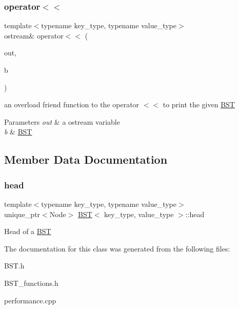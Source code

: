 \subsubsection{\texorpdfstring{operator$<$$<$}{operator<<}}
{\footnotesize\ttfamily template$<$typename key\+\_\+type, typename value\+\_\+type$>$ \\
ostream\& operator$<$$<$ (\begin{DoxyParamCaption}\item[{ostream \&}]{out,  }\item[{\mbox{\hyperlink{class_b_s_t}{B\+ST}}$<$ key\+\_\+type, value\+\_\+type $>$ \&}]{b }\end{DoxyParamCaption})\hspace{0.3cm}{\ttfamily [friend]}}

an overload friend function to the operator $<$$<$ to print the given \mbox{\hyperlink{class_b_s_t}{B\+ST}} 
\begin{DoxyParams}{Parameters}
{\em out} & a ostream variable \\
\hline
{\em b} & \mbox{\hyperlink{class_b_s_t}{B\+ST}} \\
\hline
\end{DoxyParams}


\subsection{Member Data Documentation}
\mbox{\label{class_b_s_t_a4e8687535054becc0b625a3ef89c3bd2}} 
\subsubsection{\texorpdfstring{head}{head}}
{\footnotesize\ttfamily template$<$typename key\+\_\+type, typename value\+\_\+type$>$ \\
unique\+\_\+ptr$<$Node$>$ \mbox{\hyperlink{class_b_s_t}{B\+ST}}$<$ key\+\_\+type, value\+\_\+type $>$\+::head}

Head of a \mbox{\hyperlink{class_b_s_t}{B\+ST}} 

The documentation for this class was generated from the following files\+:\begin{DoxyCompactItemize}
\item 
B\+S\+T.\+h\item 
B\+S\+T\+\_\+functions.\+h\item 
performance.\+cpp\end{DoxyCompactItemize}
